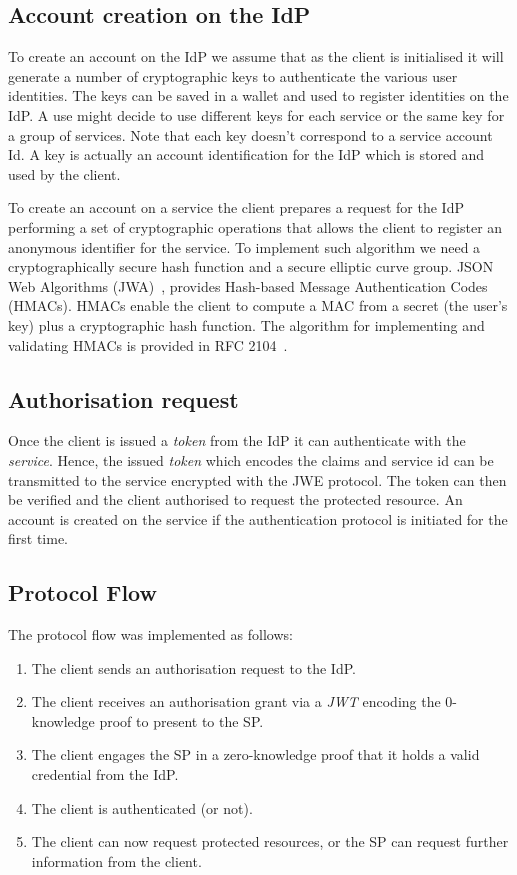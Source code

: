 \subsection{Account creation on the IdP}

To create an account on the IdP we assume that as the client is initialised it will generate a number of cryptographic keys to authenticate the various user identities. The keys can be saved in a wallet and used to register identities on the IdP. A use might decide to use different keys for each service or the same key for a group of services. Note that each key doesn't correspond to a service account Id. A key is actually an account identification for the IdP which is stored and used by the client.

To create an account on a service the client prepares a request for the IdP performing a set of cryptographic operations that allows the client to register an anonymous identifier for the service. To implement such algorithm we need a
cryptographically secure hash function and a secure elliptic curve group. JSON Web Algorithms (JWA)~\cite{jones2015jwa}, provides Hash-based Message Authentication Codes (HMACs). HMACs enable the client to compute a MAC from a secret (the user's key) plus a cryptographic hash function. The algorithm for implementing and validating HMACs is provided in RFC 2104~\cite{krawczyk1997rfc}.

\subsection{Authorisation request}

Once the client is issued a \emph{token} from the IdP it can authenticate with the \emph{service}. Hence, the issued \emph{token} which encodes the claims and service id can be transmitted to the service encrypted with the JWE protocol. The token can then be verified and the client authorised to request the protected resource. An account is created on the service if the authentication protocol is initiated for the first time.

\subsection{Protocol Flow}

The protocol flow was implemented as follows:
\begin{enumerate}
    \item The client sends an authorisation request to the IdP.
    \item The client receives an authorisation grant via a \emph{JWT} encoding the 0-knowledge proof to present to the SP.
    \item The client engages the SP in a zero-knowledge proof that it holds a valid credential from the IdP.
    \item The client is authenticated (or not).
    \item The client can now request protected resources, or the SP can request further information from the client.
\end{enumerate}

